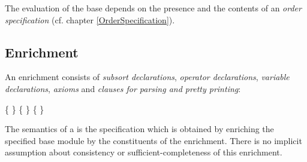 {The evaluation of the base depends on the presence and the contents of
an {\em order specification} (cf. chapter \ref{OrderSpecification}).


\subsection{Enrichment}
\label{enrichment}

An enrichment consists of {\em subsort declarations},
{\em operator declarations}, {\em variable declarations}, 
{\em axioms} and {\em clauses for parsing and pretty printing}:

\begin{syntax}
 \IS \{  \}
 \AND \{ \} 
 \AND [ \nt{variableDeclarations} ] 
 \AND \{  \} 
\end{syntax}

The semantics of a  is the specification
which is obtained by enriching the specified base module
by the constituents of the enrichment. There is no implicit
assumption about consistency or sufficient-completeness of this
enrichment.

}
